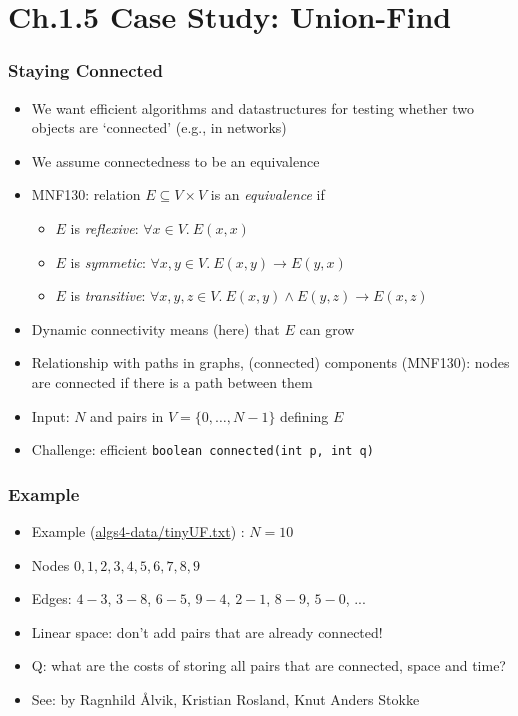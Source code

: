 \documentclass[handout]{beamer}
\newcommand{\set}[1]{\{#1\}}
\begin{document}
\section{Ch.1.5 Case Study: Union-Find}

\frame
  {
    
    \frametitle{Staying Connected}

\begin{itemize}[<+->]
\item We want efficient algorithms and datastructures 
for testing whether two objects are `connected' (e.g., in networks)
\item We assume connectedness to be an equivalence
\item MNF130: relation $E\subseteq V\times V$ is an \emph{equivalence} if
  \begin{itemize}
  \item $E$ is \emph{reflexive}: $\forall x\in V.~ E(x,x)$
  \item $E$ is \emph{symmetic}: $\forall x,y\in V.~ E(x,y) \to E(y,x)$
  \item $E$ is \emph{transitive}: $\forall x,y,z\in V.~ E(x,y)\land E(y,z) \to E(x,z)$
  \end{itemize}
\item Dynamic connectivity means (here) that $E$ can grow %
\item Relationship with paths in graphs, (connected) components (MNF130): 
nodes are connected if there is a path between them
\item Input: $N$ and  pairs in $V=\set{0,\ldots,N{-}1}$ defining $E$
\item Challenge: efficient {\tt boolean connected(int p, int q)} 
\end{itemize}  
}

\frame
  {
    
    \frametitle{Example}

\begin{itemize}[<+->]

\item Example (\url{algs4-data/tinyUF.txt}) : $N=10$
\item Nodes $0,1,2,3,4,5,6,7,8,9$
\item Edges: $4{-}3$, $3{-}8$,  $6{-}5$, $9{-}4$, $2{-}1$, $8{-}9$, $5{-}0$, ...
\item Linear space: don't add pairs that are already connected!
\item Q: what are the costs of storing all pairs that are connected, space and time?
\item See: \href{https://bitbucket.org/algoritmevisualisering/algoritmevisualisering}%
{{\color{red}{algoritmevisualisering}}} by Ragnhild \AA lvik, Kristian Rosland, Knut Anders Stokke
\end{itemize}  
}
\end{document}
